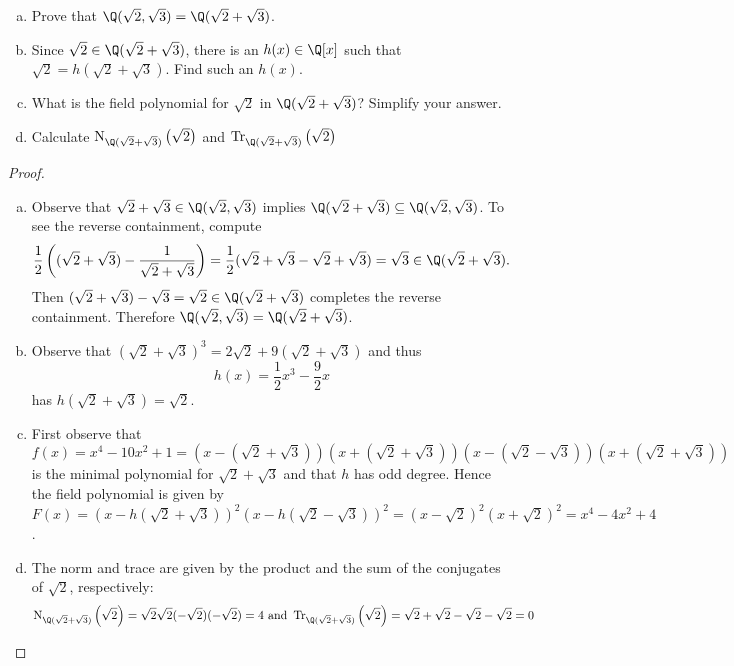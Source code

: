 \documentclass[10pt]{amsart}
\newcommand{\Tr}[2]{\operatorname{Tr}_{#1}\left(#2\right)}
\newcommand{\Norm}[2]{\operatorname{N}_{#1}\left(#2\right)}
\begin{document}
\begin{ex3}
  \begin{enumerate}[(a)]
    \item
      Prove that $\Q(\sqrt{2}, \sqrt{3}) = \Q(\sqrt{2} + \sqrt{3})$.
    \item
      Since $\sqrt{2} \in \Q(\sqrt{2} + \sqrt{3})$, there is an $h(x) \in \Q[x]$ such that $\sqrt{2} = h(\sqrt{2} + \sqrt{3})$.
      Find such an $h(x)$.
    \item
      What is the field polynomial for $\sqrt{2}$ in $\Q(\sqrt{2} + \sqrt{3})$?
      Simplify your answer.
    \item
      Calculate $\Norm{\Q(\sqrt{2} + \sqrt{3})}{\sqrt{2}}$ and $\Tr{\Q(\sqrt{2} + \sqrt{3})}{\sqrt{2}}$
  \end{enumerate}
  \begin{proof}
    \begin{enumerate}[(a)]
    \item
      Observe that $\sqrt{2} + \sqrt{3} \in \Q(\sqrt{2}, \sqrt{3})$ implies $\Q(\sqrt{2} + \sqrt{3}) \subseteq \Q(\sqrt{2}, \sqrt{3})$.
      To see the reverse containment, compute
      $$\frac{1}{2} \left( (\sqrt{2} + \sqrt{3}) - \frac{1}{\sqrt{2} + \sqrt{3}} \right) = \frac{1}{2}(\sqrt{2} + \sqrt{3} - \sqrt{2} + \sqrt{3}) = \sqrt{3} \in \Q(\sqrt{2} + \sqrt{3}).$$
      Then $(\sqrt{2} + \sqrt{3}) - \sqrt{3} = \sqrt{2} \in \Q(\sqrt{2} + \sqrt{3})$ completes the reverse containment.
      Therefore $\Q(\sqrt{2}, \sqrt{3}) = \Q(\sqrt{2} + \sqrt{3})$.
    \item
      Observe that $(\sqrt{2} + \sqrt{3})^3 = 2\sqrt{2} + 9(\sqrt{2} + \sqrt{3})$ and thus
      $$h(x) = \frac{1}{2}x^3 - \frac{9}{2}x$$
      has $h(\sqrt{2} + \sqrt{3}) = \sqrt{2}$.
    \item
      First observe that $$f(x) = x^4 - 10x^2 + 1 = (x - (\sqrt{2} + \sqrt{3}))(x + (\sqrt{2} + \sqrt{3}))(x - (\sqrt{2} - \sqrt{3}))(x + (\sqrt{2} + \sqrt{3}))$$
      is the minimal polynomial for $\sqrt{2} + \sqrt{3}$ and that $h$ has odd degree.
      Hence the field polynomial is given by $F(x) = (x - h(\sqrt{2} + \sqrt{3}))^2(x - h(\sqrt{2} - \sqrt{3}))^2 = (x-\sqrt{2})^2(x + \sqrt{2})^2 = x^4 - 4x^2 + 4$.
    \item
      The norm and trace are given by the product and the sum of the conjugates of $\sqrt{2}$, respectively:
      $$\Norm{\Q(\sqrt{2} + \sqrt{3})}{\sqrt{2}} = \sqrt{2}\sqrt{2}(-\sqrt{2})(-\sqrt{2}) = 4 \text{ and } \Tr{\Q(\sqrt{2} + \sqrt{3})}{\sqrt{2}} = \sqrt{2} + \sqrt{2} - \sqrt{2} - \sqrt{2} = 0$$
    \end{enumerate}
  \end{proof}
\end{ex3}
\end{document}

